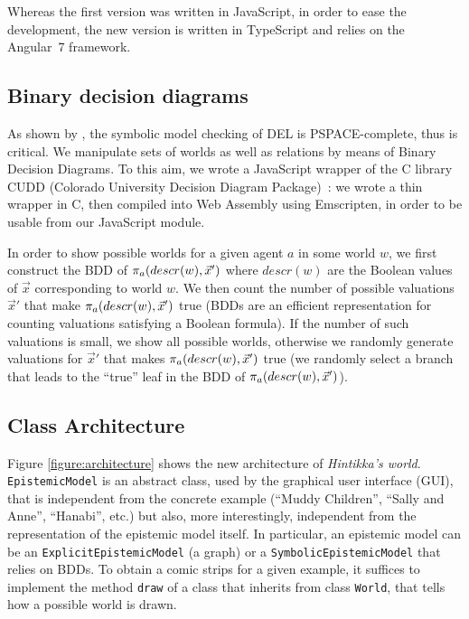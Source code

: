 
Whereas the first version was written in JavaScript, in order to ease the development, the new version is written in TypeScript and relies on the Angular~7 framework.

\subsection{Binary decision diagrams}

As shown by \citet{DBLP:conf/atal/CharrierS17}, the symbolic model checking of DEL is PSPACE-complete, thus is critical. We manipulate sets of worlds as well as relations by means of Binary Decision Diagrams. To this aim, we wrote a JavaScript wrapper of the C library CUDD (Colorado University Decision Diagram Package)~\cite{DBLP:journals/sttt/Somenzi01}: we wrote a thin wrapper in C, then compiled into Web Assembly using Emscripten, in order to be usable from our JavaScript module.

In order to show possible worlds for a given agent $a$ in some world $w$, we first construct the BDD of $\pi_{a}(descr(w), \vec x')$ where $descr(w)$ are the Boolean values of $\vec x$ corresponding to world $w$. We then count the number of possible valuations $\vec x'$ that make $\pi_{a}(descr(w), \vec x')$ true (BDDs are an efficient representation for counting valuations satisfying a Boolean formula). If the number of such valuations is small, we show all possible worlds, otherwise we randomly generate valuations for $\vec x'$ that makes $\pi_{a}(descr(w), \vec x')$ true (we randomly select a branch that leads to the ``true'' leaf in the BDD of $\pi_{a}(descr(w), \vec x')$).

\subsection{Class Architecture}

Figure \ref{figure:architecture} shows the new architecture of \emph{Hintikka's world}. \texttt{EpistemicModel} is an abstract class, used by the graphical user interface (GUI), that is independent from the concrete example (``Muddy Children'', ``Sally and Anne'', ``Hanabi'', etc.) but also, more interestingly, independent from the representation of the epistemic model itself. In particular, an epistemic model can be an \texttt{ExplicitEpistemicModel} (a graph) or a \texttt{SymbolicEpistemicModel} that relies on BDDs. To obtain a comic strips for a given example, it suffices to implement the method \texttt{draw} of a class that inherits from class \texttt{World}, that tells how a possible world is drawn.


